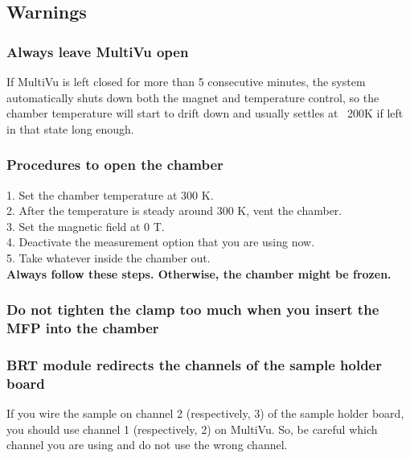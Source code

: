 \documentclass{article}
\begin{document}
    \subsection{Warnings}
        \subsubsection{Always leave MultiVu open}
            If MultiVu is left closed for more than 5 consecutive minutes, the system automatically shuts down both the magnet and temperature control, so the chamber temperature will start to drift down and usually settles at ~200K if left in that state long enough.
        
        \subsubsection{Procedures to open the chamber}
            1. Set the chamber temperature at 300 K.\\
            2. After the temperature is steady around 300 K, vent the chamber.\\
            3. Set the magnetic field at 0 T.\\
            4. Deactivate the measurement option that you are using now.\\
            5. Take whatever inside the chamber out.\\
        \textbf{Always follow these steps. Otherwise, the chamber might be frozen.}\\

        \subsubsection{Do not tighten the clamp too much when you insert the MFP into the chamber}

        \subsubsection{BRT module redirects the channels of the sample holder board}
            If you wire the sample on channel 2 (respectively, 3) of the sample holder board, you should use channel 1 (respectively, 2) on MultiVu. So, be careful which channel you are using and do not use the wrong channel.
    
\end{document}
